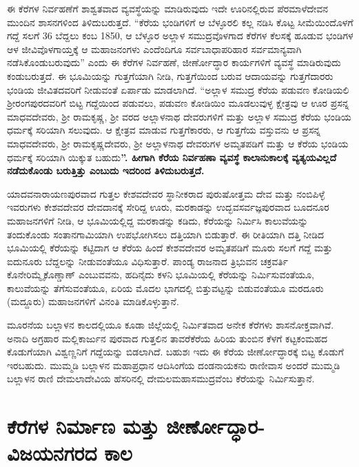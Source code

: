 ಈ ಕೆರೆಗಳ ನಿರ್ವಹಣೆಗೆ ಶಾಶ್ವತವಾದ ವ್ಯವಸ್ಥೆಯನ್ನು ಮಾಡಿರುವುದು ಇದೇ ಊರಿನಲ್ಲಿರುವ ಪೆರಮಾಳೆದೇವನ ಮುಂದಿನ ಶಾಸನಗಳಿಂದ ತಿಳಿದುಬರುತ್ತದೆ. “ಕೆರೆಯ ಭಂಡಿಗಳಿಗೆ ಆ ಬೆಳ್ಳೂರಲಿ ಕಲ್ಲ ನಡಿಸಿ ಕೊಟ್ಟ ಸೀಮೆಯಿಂದೊಳಗೆ ಗದ್ದೆ ಸಲಗೆ 36 ಬೆದ್ದಲು ಕಂಬ 1850, ಆ ಬೆಳ್ಳೂರ ಅಲ್ಲಾಳ ಸಮುದ್ರವೊಳಗಾದ ಕೆರೆಗಳ ಕೆಲಸಕ್ಕೆ ಹೂಡುವ ಭಂಡಿಗಳ ಆಳ ಜೀವಿವೊಳಗಾಯ್ತಕ್ಕೆ ಆ ಮಹಾಜನಂಗಳು ಎಂದೆಂದಿಗೂ ಸರ್ವಬಾಧಾಪರಿಹಾರ ಸರ್ವಮಾನ್ಯವಾಗಿ ನಡೆಸಿಕೊಂಡುಬರುವುದು” ಎಂದು ಈ ಕೆರೆಗಳ ನಿರ್ವಹಣೆ, ಜೀರ್ಣೋದ್ಧಾರ ಕಾರ್ಯಗಳಿಗೆ ವ್ಯವಸ್ಥೆ ಮಾಡಿರುವುದು ಕಂಡುಬರುತ್ತದೆ. ಈ ಭೂಮಿಯನ್ನು ಗುತ್ತಗೆಯಾಗಿ ನೀಡಿ, ಗುತ್ತಗೆಯಿಂದ ಬರುವ ಆದಾಯವನ್ನು ಗುತ್ತಗೆದಾರರು ಭಂಡಿಯ ಜೀವಿತದವರಿಗೆ ನೀಡುವಂತೆ ಏರ್ಪಾಡು ಮಾಡಲಾಗಿದೆ. “ಅಲ್ಲಾಳ ಸಮುದ್ರ ಕೆರೆಯ ಪಡುವಣ ಕೋಡಿಯಲಿ ಶ‍್ರೀರಂಗಪುರದವರಿಗೆ ಬಿಟ್ಟ ಗದ್ದೆಯಿಂದ ಪಡುವಲು, ಪಡುವಣ ಕೋಡಿಯಿಂ ಮೂಡಲುವುಳ್ಳ ಕ್ಷೇತ್ರವು ಆ ಊರ ಪ್ರಸನ್ನ ಮಾಧವದೇವರು, ಶ‍್ರೀ ರಾಮಕೃಷ್ಣ, ಶ‍್ರೀ ವರದ ಅಲ್ಲಾಳನಾಥ ದೇವರುಗಳಿಗೆ ಮತ್ತು ಅಲ್ಲಾಳ ಸಮುದ್ರ ಕೆರೆಯ ಭಂಡಿಯ ಧರ್ಮಕ್ಕೆ ಸರಿಯಾಗಿ ಸಲುವುದು. ಆ ಕ್ಷೇತ್ರವ ಮಾಡುವ ಗುತ್ತಗೆಕಾರರು, ಆ ಗುತ್ತಗೆಯ ವಸ್ತುವನು ಆ ಪ್ರಸನ್ನ ಮಾಧವದೇವರು, ಶ‍್ರೀ ರಾಮಕೃಷ್ಣದೇವರು, ಶ‍್ರೀ ಅಲ್ಲಾಳನಾಥ ದೇವರುಗಳ ಅಮೃತಪಡಿಗೆ ಮತ್ತು ಆ ಕೆರೆಯ ಭಂಡಿಯ ಧರ್ಮಕ್ಕೆ ಸರಿಯಾಗಿ ಯಿಕ್ಕುತ ಬಹುದು\textbf{”. ಹೀಗಾಗಿ ಕೆರೆಯ ನಿರ್ವಹಣಾ ವ್ಯವಸ್ಥೆ ಕಾಲಾನುಕಾಲಕ್ಕೆ ವ್ಯತ್ಯಯವಿಲ್ಲದೆ ನಡೆದುಕೊಂಡು ಬರುತ್ತಿತ್ತು ಎಂಬುದು ಇದರಿಂದ ತಿಳಿದುಬರುತ್ತದೆ. }

ಯಾದವನಾರಾಯಣಪುರವಾದ ಗುತ್ತಲ ಕೇಶವದೇವರ ಸ್ಥಾನೀಕರಾದ ಪುರುಷೋತ್ತಮ ದೇವ ಮತ್ತು ನಂಬಿಪಿಳ್ಳೆ ಇವರುಗಳು ಕೇಶವದೇವರ ದೇವದಾನಕ್ಕೆ ಸೇರಿದ್ದ ಊರು, ಮರಕಾಡನ್ನು ಉದ್ಭವಸರ್ವಜ್ಞಪುರವಾದ ಬೂದನೂರ ಮಹಾಜನಗಳಿಗೆ ನೀಡಿ, ಆ ಭೂಮಿಯಲ್ಲಿದ್ದ ಮರಕಾಡನ್ನು ಕಡಿದು, ಕೆರೆಯನ್ನು ನಿರ್ಮಿಸಿ ಕಾಲುವೆಯನ್ನು ತಂದುಕೊಂಡು ಸಂತಾನಗಾಮಿಯಾಗಿ ಉಪಭೋಗಿಸಲು ದತ್ತಿಯಾಗಿ ಬಿಡುತ್ತಾರೆ. ಈ ರೀತಿಯಾಗಿ ದತ್ತಿ ನೀಡಿದ ಭೂಮಿಯಲ್ಲಿ ಕೆರೆಯನ್ನು ಕಟ್ಟಿದಾಗ ಆ ಕೆರೆಯ ಹಿಂದೆ ಕೇಶವದೇವರ ಅಮೃತಪಡಿಗೆ ಮೂರು ಸಲಗೆ ಗದ್ದೆ ಮತ್ತು ಐದುನೂರು ಬೆದ್ದಲನ್ನು ನೀಡುವಂತೆಯೂ ವಿಧಿಸುತ್ತಾರೆ. ಪಾಂಡ್ಯ ರಾಜನಾದ ತ್ರಿಭುವನ ಚಕ್ರವರ್ತಿ ಕೊನೇರಿಮ್ಮೈಕೊಣ್ಡಾಣ್​ ಎಂಬುವವನು, ಹದಿನೈದು ಕಳನಿ ಭೂಮಿಯಲ್ಲಿ ಕೆರೆಯನ್ನು ನಿರ್ಮಿಸುವಂತೆಯೂ, ಕಾಲುವೆಯನ್ನು ತೆಗೆಸುವಂತೆಯೂ, ಏರಿಯ ಮೊದಲ ಭಾಗದಲ್ಲಿ ಬಿತ್ತುವಟ್ಟನ್ನು ಬಿಡುವಂತೆಯೂ ಮರದೂರು (ಮದ್ದೂರು) ಮಹಾಜನಗಳಿಗೆ ವಿನಂತಿ ಮಾಡಿಕೊಳ್ಳುತ್ತಾನೆ.

ಮೂರನೆಯ ಬಲ್ಲಾಳನ ಕಾಲದಲ್ಲಿಯೂ ಕೂಡಾ ಜಿಲ್ಲೆಯಲ್ಲಿ ನಿರ್ಮಿತವಾದ ಅನೇಕ ಕೆರೆಗಳು ಶಾಸನೋಕ್ತವಾಗಿವೆ. ಅನಾದಿ ಅಗ್ರಹಾರ ಮಲ್ಲಿಕಾರ್ಜುನ ಪುರವಾದ ಗುತ್ತಲಿನ ತಾವರೆಕೆರೆಯ ಹಿರಿಯ ತುಂಬಿನ ಕೆಳಗೆ ಕಟ್ಟಕಂಮಹದ ಕೊಡುಗೆಯಾಗಿ ವಿಶ್ವಣ್ಣನಿಗೆ ಗದ್ದೆಯನ್ನು ಬಿಡಲಾಗಿದೆ. ಬಹುಶಃ ಇದು ಈ ಕೆರೆಯ ಜೀರ್ಣೋದ್ಧಾರಕ್ಕೆ ಬಿಟ್ಟ ಕೊಡುಗೆ ಇರಬಹುದು. ಮುಮ್ಮಡಿ ಬಲ್ಲಾಳನ ಮಹಾಪ್ರಧಾನ ಆದಿಸಿಂಗೆಯ ದಂಡನಾಯಕನು ರಾಣೀವಾಸ ಅಂದರೆ ಮುಮ್ಮಡಿ ಬಲ್ಲಾಳನ ರಾಣಿ ದೇಮಲಾದೇವಿಯ ಹೆಸರಿನಲ್ಲಿ ದೇಮಲಮಹಾಸಮುದ್ರವೆಂಬ ಕೆರೆಯನ್ನು ನಿರ್ಮಿಸುತ್ತಾನೆ.


\section{ಕೆರೆಗಳ ನಿರ್ಮಾಣ ಮತ್ತು ಜೀರ್ಣೋದ್ಧಾರ-ವಿಜಯನಗರದ ಕಾಲ}


